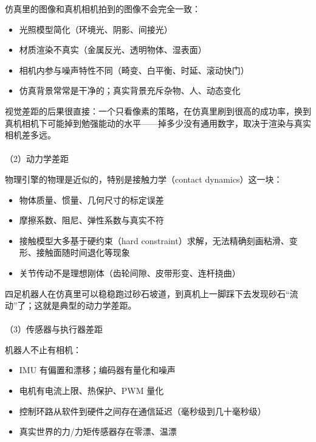 \documentclass[
  chinese,
]{ctexart}
\makeatletter
\let\oldparagraph\paragraph
\renewcommand{\paragraph}{
    \@ifstar
      \xxxParagraphStar
      \xxxParagraphNoStar
  }
\newcommand{\xxxParagraphStar}[1]{\oldparagraph*{#1}\mbox{}}
\newcommand{\xxxParagraphNoStar}[1]{\oldparagraph{#1}\mbox{}}
\providecommand{\tightlist}{%
  \setlength{\itemsep}{0pt}\setlength{\parskip}{0pt}}
\makeatother
\begin{document}
仿真里的图像和真机相机拍到的图像不会完全一致：

\begin{itemize}
\tightlist
\item
  光照模型简化（环境光、阴影、间接光）
\item
  材质渲染不真实（金属反光、透明物体、湿表面）
\item
  相机内参与噪声特性不同（畸变、白平衡、时延、滚动快门）
\item
  仿真背景常常是干净的；真实背景充斥杂物、人、动态变化
\end{itemize}

视觉差距的后果很直接：一个只看像素的策略，在仿真里刷到很高的成功率，换到真机相机下可能掉到勉强能动的水平------掉多少没有通用数字，取决于渲染与真实相机差多远。

\paragraph{（2）动力学差距}\label{ux52a8ux529bux5b66ux5deeux8ddd}

物理引擎的物理是近似的，特别是接触力学（contact dynamics）这一块：

\begin{itemize}
\tightlist
\item
  物体质量、惯量、几何尺寸的标定误差
\item
  摩擦系数、阻尼、弹性系数与真实不符
\item
  接触模型大多基于硬约束（hard
  constraint）求解，无法精确刻画粘滑、变形、接触面随时间退化等现象
\item
  关节传动不是理想刚体（齿轮间隙、皮带形变、连杆挠曲）
\end{itemize}

四足机器人在仿真里可以稳稳跑过砂石坡道，到真机上一脚踩下去发现砂石``流动''了；这就是典型的动力学差距。

\paragraph{（3）传感器与执行器差距}\label{ux4f20ux611fux5668ux4e0eux6267ux884cux5668ux5deeux8ddd}

机器人不止有相机：

\begin{itemize}
\tightlist
\item
  IMU 有偏置和漂移；编码器有量化和噪声
\item
  电机有电流上限、热保护、PWM 量化
\item
  控制环路从软件到硬件之间存在通信延迟（毫秒级到几十毫秒级）
\item
  真实世界的力/力矩传感器存在零漂、温漂
\end{itemize}
\end{document}

